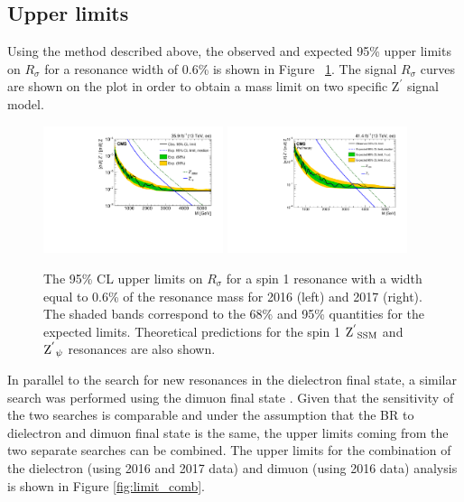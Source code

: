 \subsection{Upper limits}
Using the method described above, the observed and expected 95\% upper limits on $R_\sigma$ for a resonance width of 0.6\% is shown in Figure ~\ref{fig:limit_ee}.
The signal $R_{\sigma}$ curves are shown on the plot in order to obtain a mass limit on two specific $\mathrm{Z}^{'}$ signal model.

\begin{figure}[!htb]
\centering
\includegraphics[width=0.47\textwidth]{figures/Zprime/2016/paper/Figure_003-a.pdf}
\includegraphics[width=0.47\textwidth]{figures/Zprime/2017/limitInputs/limitPlot_Dielectron2017_forApproval.pdf}
 \caption{The 95\% CL upper limits on $R_\sigma$ for a spin 1 resonance with a width equal to 0.6\% of the resonance mass for 2016 (left) and 2017 (right). The shaded bands correspond to the 68\% and 95\% quantities for the expected limits.  Theoretical predictions for the spin 1 $\mathrm{Z^{'}}_\mathrm{SSM}$ and $\mathrm{Z^{'}}_\mathrm{\psi}$ resonances are also shown.}
\label{fig:limit_ee}
\end{figure}

\medskip
In parallel to the search for new resonances in the dielectron final state, a similar search was performed using the dimuon final state \cite{CMS-AN-2016-391}.
Given that the sensitivity of the two searches is comparable and under the assumption that the BR to dielectron and dimuon final state is the same, the upper limits coming from the two separate searches can be combined. The upper limits for the combination of the dielectron (using 2016 and 2017 data) and dimuon (using 2016 data) analysis is shown in Figure \ref{fig:limit_comb}.

